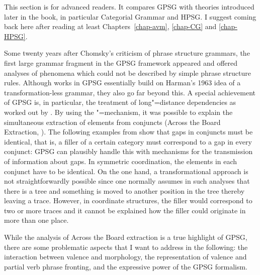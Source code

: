 This section is for advanced readers. It compares GPSG with theories introduced later in the book,
in particular Categorial Grammar and HPSG. I suggest coming back here after reading at least
Chapters~\ref{chap-avm}, \ref{chap-CG} and \ref{chap-HPSG}.

Some
twenty years after Chomsky's criticism of phrase structure grammars, the first large grammar fragment in the GPSG framework appeared and offered analyses of phenomena
which could not be described by simple phrase structure rules. Although works in GPSG essentially build on Harman's 1963 idea of a transformation-less grammar, they also go far
beyond this. A special achievement of GPSG is, in particular, the treatment of long"=distance dependencies as worked out by \citet{Gazdar81a}. By using the \slasch"=mechanism, it
was possible to explain the simultaneous extraction of elements from conjuncts (Across the Board Extraction, \citealp{Ross67a,Williams78a}). The following examples from
\citet[]{Gazdar81a} show that gaps in conjuncts must be identical, that is, a filler of a certain category must correspond to a gap in every conjunct:
\eal\settowidth{}
\label{ex-atb-gazdar}
\zl
GPSG can plausibly handle this with mechanisms for the transmission of information about gaps. In symmetric coordination, the \slasch elements in each conjunct have
to be identical. On the one hand,
a transformational approach is not straightforwardly possible since
one normally assumes in such analyses that there is a tree and something is moved to another
position in the tree thereby leaving a trace. However, in coordinate structures, the filler would
correspond to two or more traces and it cannot be explained how the filler could originate in more
than one place.

While the analysis of Across the Board extraction is a true highlight of GPSG, there are some problematic
aspects that I want to address in the following: the interaction between valence and morphology,
the representation of valence and partial verb phrase fronting, and the expressive power of the GPSG
formalism. 


